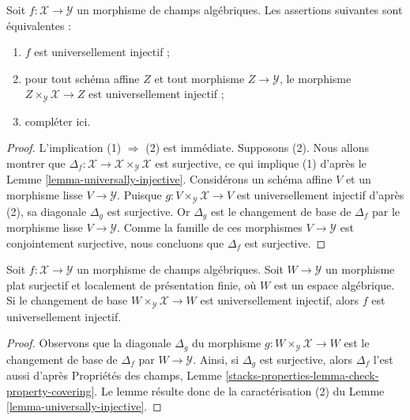 \begin{lemma}
\label{lemma-universally-injective-local}
Soit $f : \mathcal{X} \to \mathcal{Y}$ un morphisme de champs algébriques.
Les assertions suivantes sont équivalentes :
\begin{enumerate}
\item $f$ est universellement injectif ;
\item pour tout schéma affine $Z$ et tout morphisme
$Z \to \mathcal{Y}$, le morphisme
$Z \times_\mathcal{Y} \mathcal{X} \to Z$
est universellement injectif ;
\item compléter ici.
\end{enumerate}
\end{lemma}

\begin{proof}
L'implication (1) $\Rightarrow$ (2) est immédiate.
Supposons (2). Nous allons montrer que
$\Delta_f : \mathcal{X} \to \mathcal{X} \times_\mathcal{Y} \mathcal{X}$
est surjective, ce qui implique (1) d'après le
Lemme \ref{lemma-universally-injective}.
Considérons un schéma affine $V$ et un morphisme lisse
$V \to \mathcal{Y}$. Puisque
$g : V \times_\mathcal{Y} \mathcal{X} \to V$
est universellement injectif d'après (2), sa diagonale
$\Delta_g$ est surjective.
Or $\Delta_g$ est le changement de base de $\Delta_f$
par le morphisme lisse $V \to \mathcal{Y}$.
Comme la famille de ces morphismes $V \to \mathcal{Y}$ est
conjointement surjective, nous concluons que $\Delta_f$ est surjective.
\end{proof}

\begin{lemma}
\label{lemma-check-universally-injective-covering}
Soit $f : \mathcal{X} \to \mathcal{Y}$ un morphisme de champs algébriques.
Soit $W \to \mathcal{Y}$ un morphisme plat surjectif et localement
de présentation finie, où $W$ est un espace algébrique. Si le changement
de base $W \times_\mathcal{Y} \mathcal{X} \to W$ est universellement
injectif, alors $f$ est universellement injectif.
\end{lemma}

\begin{proof}
Observons que la diagonale $\Delta_g$ du morphisme
$g : W \times_\mathcal{Y} \mathcal{X} \to W$
est le changement de base de $\Delta_f$ par $W \to \mathcal{Y}$.
Ainsi, si $\Delta_g$ est surjective, alors $\Delta_f$ l'est aussi
d'après Propriétés des champs, Lemme
\ref{stacks-properties-lemma-check-property-covering}.
Le lemme résulte donc de la caractérisation (2) du
Lemme \ref{lemma-universally-injective}.
\end{proof}








